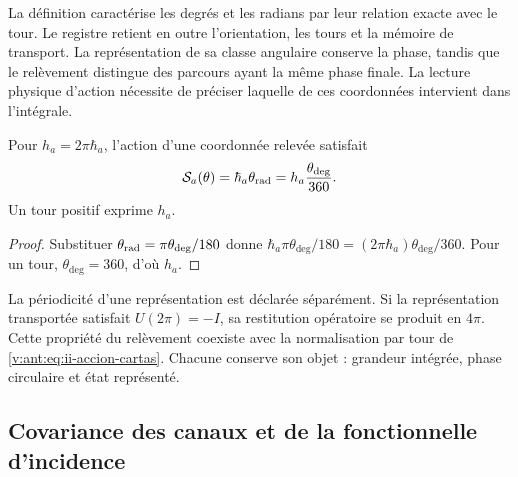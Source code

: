 La définition caractérise les degrés et les radians par leur relation exacte
avec le tour. Le registre retient en outre l’orientation, les tours et la
mémoire de transport. La représentation de sa classe angulaire conserve
la phase, tandis que le relèvement distingue des parcours ayant la même
phase finale. La lecture physique d’action nécessite de préciser laquelle de
ces coordonnées intervient dans l’intégrale.

\begin{proposition}
Pour \(h_a=2\pi\hbar_a\), l'action d'une coordonnée relevée
satisfait
\begin{equation}
 \mathcal S_a(\theta)
 =\hbar_a\theta_{\rm rad}
 =h_a\frac{\theta_{\deg}}{360}.
 \label{v:ant:eq:ii-accion-cartas}
\end{equation}
Un tour positif exprime \(h_a\).
\end{proposition}
\begin{proof}
Substituer \(\theta_{\rm rad}=\pi\theta_{\deg}/180\) donne
\(\hbar_a\pi\theta_{\deg}/180
=(2\pi\hbar_a)\theta_{\deg}/360\). Pour un tour,
\(\theta_{\deg}=360\), d'où \(h_a\).
\end{proof}

La périodicité d'une représentation est déclarée séparément. Si la
représentation transportée satisfait \(U(2\pi)=-I\), sa restitution
opératoire se produit en \(4\pi\). Cette propriété du relèvement
coexiste avec la normalisation par tour de
\eqref{v:ant:eq:ii-accion-cartas}. Chacune conserve son objet : grandeur
intégrée, phase circulaire et état représenté.

\subsection{Covariance des canaux et de la fonctionnelle d'incidence}

